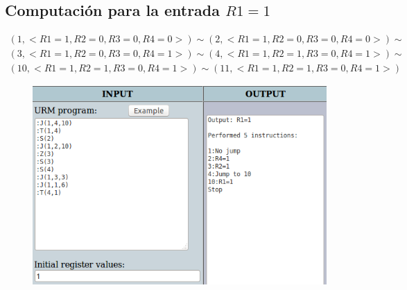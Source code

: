 		\subsection{Computación para la entrada $R1=1$}
  		\begin{equation*}\begin{gathered}
		(1, <R1=1, R2=0, R3=0, R4=0>) \sim (2, <R1=1, R2=0, R3=0, R4=0>) \sim\\
		(3, <R1=1, R2=0, R3=0, R4=1>) \sim (4, <R1=1, R2=1, R3=0, R4=1>) \sim\\
		(10, <R1=1, R2=1, R3=0, R4=1>) \sim (11, <R1=1, R2=1, R3=0, R4=1>)
		\end{gathered}\end{equation*}
		\begin{figure}[H]
  			\centering
  			\includegraphics[scale=0.5]{images/41.png}
  		\end{figure}
